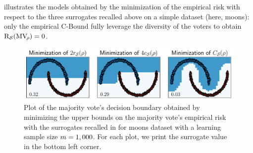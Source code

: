  illustrates the models obtained by the minimization of the empirical risk with respect to the three surrogates recalled above on a simple dataset (here, moons): only the empirical C-Bound fully leverage the diversity of the voters to obtain $\text{R}_{\mathcal{S}}(\text{MV}_{\!\rho})=0$.

\begin{figure}[H]
    \centering
    \includegraphics[width=1.0\linewidth]{chapter_5/figures/moons_risk.pdf}
    \caption[
    Comparison of the Minimization of the Surrogates on Moons]{Plot of the majority vote's decision boundary obtained by minimizing the upper bounds on the majority vote's empirical risk with the surrogates recalled in  for moons dataset with a learning sample size $m=1,000$.
    For each plot, we print the surrogate value in the bottom left corner.
    }
    \label{chap:mv-sto:fig:moons-risk}
\end{figure}

